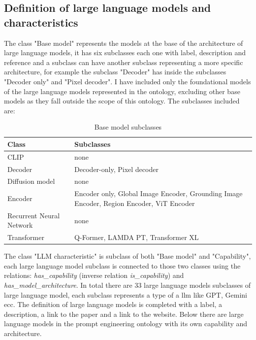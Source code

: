 \subsection{Definition of large language models and characteristics}

The class "Base model" represents the models at the base of the architecture of large language models, it has six subclasses each one with label, description and reference and a subclass can have another subclass representing a more specific architecture, for example the subclass "Decoder" has inside the subclasses "Decoder only" and "Pixel decoder". 
I have included only the foundational models of the large language models represented in the ontology, excluding other base models as they fall outside the scope of this ontology. The subclasses included are: 
\begin{table}[H]
    \centering
    \begin{tabular}{|>{\raggedright\arraybackslash}p{6cm}|>{\raggedright\arraybackslash}p{6cm}|}
        \hline
        \textbf{Class} & \textbf{Subclasses} \\ \hline
         CLIP & none \\ \hline
         
         Decoder & Decoder-only, Pixel decoder \\ \hline
         
         Diffusion model & none \\ \hline
         
         Encoder & Encoder only, Global Image Encoder, Grounding Image Encoder, Region Encoder, ViT Encoder \\ \hline
         
         Recurrent Neural Network & none \\ \hline

        Transformer & Q-Former, LAMDA PT, Transformer XL \\ \hline
    \end{tabular}
    \caption{Base model subclasses}
\end{table}
The class "LLM characteristic" is subclass of both "Base model" and "Capability", each large language model subclass is connected to those two classes using the relations: \textit{has\_capability} (inverse relation \textit{is\_capability}) and\\ \textit{has\_model\_architecture}. In total there are 33 large language models subclasses of large language model, each subclass represents a type of a llm like GPT, Gemini ecc. The definition of large language models is completed with a label, a description, a link to the paper and a link to the website. Below there are large language models in the prompt engineering ontology with its own capability and architecture.
